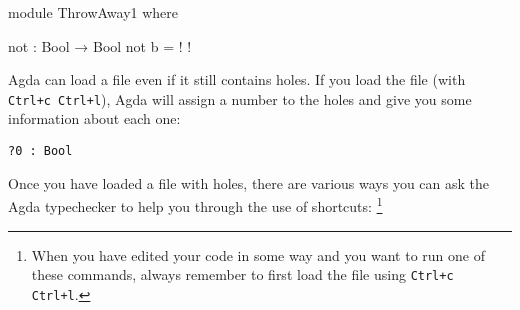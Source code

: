 \documentclass[a4paper,UKenglish]{tufte-handout}
\theoremstyle{definition}
\begin{document}
\begin{code}[hide]
module ThrowAway1 where
\end{code}
\begin{code}[number]
  not : Bool → Bool
  not b = {!  !}
\end{code}
Agda can load a file even if it still contains holes. If you load the
file (with \texttt{Ctrl+c Ctrl+l}), Agda will assign a number to the holes and give you
some information about each one:
\begin{verbatim}
?0 : Bool
\end{verbatim}
Once you have loaded a file with holes, there are various ways you can
ask the Agda typechecker to help you through the use of shortcuts:%
\footnote{When you have edited your code in some way and you
want to run one of these commands, always remember to first load the
file using \texttt{Ctrl+c Ctrl+l}.}
\end{document}
